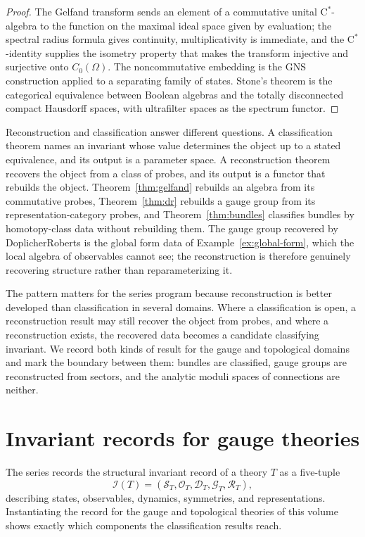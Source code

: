 \documentclass[11pt,letterpaper]{article}
\theoremstyle{definition}
\theoremstyle{remark}
\begin{document}
\begin{proof}
The Gelfand transform sends an element of a commutative unital $\mathrm{C}^*$-algebra to the function on the maximal ideal space given by evaluation; the spectral radius formula gives continuity, multiplicativity is immediate, and the $\mathrm{C}^*$-identity supplies the isometry property that makes the transform injective and surjective onto $C_0(\Omega)$. The noncommutative embedding is the GNS construction applied to a separating family of states. Stone's theorem is the categorical equivalence between Boolean algebras and the totally disconnected compact Hausdorff spaces, with ultrafilter spaces as the spectrum functor.
\end{proof}

Reconstruction and classification answer different questions. A classification theorem names an invariant whose value determines the object up to a stated equivalence, and its output is a parameter space. A reconstruction theorem recovers the object from a class of probes, and its output is a functor that rebuilds the object. Theorem~\ref{thm:gelfand} rebuilds an algebra from its commutative probes, Theorem~\ref{thm:dr} rebuilds a gauge group from its representation-category probes, and Theorem~\ref{thm:bundles} classifies bundles by homotopy-class data without rebuilding them. The gauge group recovered by Doplicher\textendash{}Roberts is the global form data of Example~\ref{ex:global-form}, which the local algebra of observables cannot see; the reconstruction is therefore genuinely recovering structure rather than reparameterizing it.

The pattern matters for the series program because reconstruction is better developed than classification in several domains. Where a classification is open, a reconstruction result may still recover the object from probes, and where a reconstruction exists, the recovered data becomes a candidate classifying invariant. We record both kinds of result for the gauge and topological domains and mark the boundary between them: bundles are classified, gauge groups are reconstructed from sectors, and the analytic moduli spaces of connections are neither.

\section{Invariant records for gauge theories}
\label{sec:invariants}

The series records the structural invariant record of a theory $T$ as a five-tuple
\[
\mathcal{I}(T) = (\mathcal{S}_T, \mathcal{O}_T, \mathcal{D}_T, \mathcal{G}_T, \mathcal{R}_T),
\]
describing states, observables, dynamics, symmetries, and representations. Instantiating the record for the gauge and topological theories of this volume shows exactly which components the classification results reach.
\end{document}
